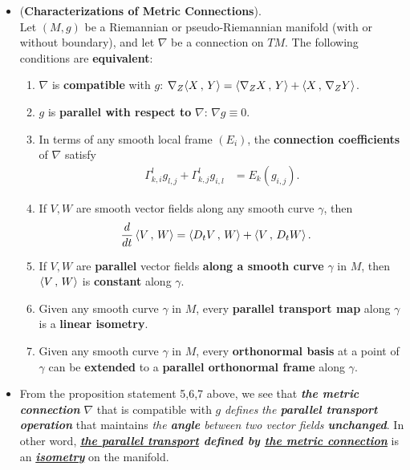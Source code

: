 \documentclass[11pt]{article}
\begin{document}
\begin{itemize}
\item \begin{proposition} (\textbf{Characterizations of Metric Connections}).\\
Let $(M, g)$ be a Riemannian or pseudo-Riemannian manifold (with or without boundary), and let $\nabla$ be a connection on $TM$. The following conditions are \textbf{equivalent}:
\begin{enumerate}
\item $\nabla$ is \textbf{compatible} with $g$: $\nabla_{Z}{\left\langle X\,,\, Y \right\rangle} = \left\langle \nabla_{Z}{X}\,,\, Y \right\rangle + \left\langle X\,,\, \nabla_{Z}{Y} \right\rangle$.
\item $g$ is \textbf{parallel with respect to} $\nabla$: $\nabla g \equiv 0$.
\item In terms of any smooth local frame $(E_i)$, the \textbf{connection coefficients} of $\nabla$ satisfy
\begin{align}
\Gamma_{k,i}^{l}g_{l,j} + \Gamma_{k,j}^{l}g_{i,l} &= E_k(g_{i,j}).  \label{eqn: metric_connection_christoffel_symbol}
\end{align}
\item If $V, W$ are smooth vector fields along any smooth curve $\gamma$, then
\begin{align}
\frac{d}{dt}\left\langle V\,,\, W \right\rangle &= \left\langle D_tV\,,\, W \right\rangle + \left\langle V\,,\, D_tW \right\rangle. \label{eqn: metric_connection_derivative_of_inn}
\end{align}
\item If $V, W$ are \textbf{parallel} vector fields \textbf{along a smooth curve} $\gamma$ in $M$, then $\left\langle V\,,\, W \right\rangle$ is \textbf{constant} along $\gamma$.
\item Given any smooth curve $\gamma$ in $M$, every \textbf{parallel transport map} along $\gamma$ is a \textbf{linear isometry}.
\item  Given any smooth curve $\gamma$ in $M$, every \textbf{orthonormal basis} at a point of $\gamma$ can be \textbf{extended} to a \textbf{parallel orthonormal frame} along $\gamma$.
\end{enumerate}
\end{proposition}

\item \begin{remark}
From the proposition statement 5,6,7 above, we see that \emph{\textbf{the metric connection}} $\nabla$ that is compatible with $g$ \emph{defines} \emph{the \textbf{parallel transport operation}} that maintains \emph{the \textbf{angle} between two vector fields \textbf{unchanged}}. In other word, \emph{\textbf{\underline{the parallel transport} defined by \underline{the metric connection}}} is  an \emph{\textbf{\underline{isometry}}} on the manifold. 
\end{remark}


\end{itemize}
\end{document}
